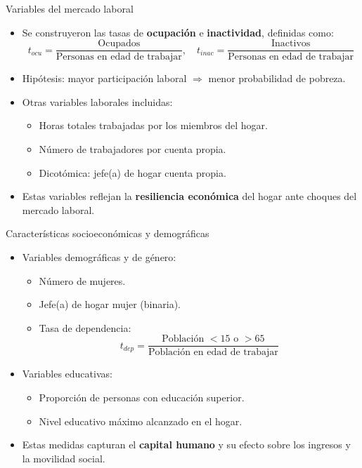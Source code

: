 \documentclass[10pt]{beamer}
\begin{document}
\begin{frame}{Variables del mercado laboral}
\small
\begin{itemize}
    \item Se construyeron las tasas de \textbf{ocupación} e \textbf{inactividad}, definidas como:
    \[
    t_{ocu} = \frac{\text{Ocupados}}{\text{Personas en edad de trabajar}}, \quad
    t_{inac} = \frac{\text{Inactivos}}{\text{Personas en edad de trabajar}}
    \]
    \item Hipótesis: mayor participación laboral $\Rightarrow$ menor probabilidad de pobreza.
    \item Otras variables laborales incluidas:
    \begin{itemize}
        \item Horas totales trabajadas por los miembros del hogar.
        \item Número de trabajadores por cuenta propia.
        \item Dicotómica: jefe(a) de hogar cuenta propia.
    \end{itemize}
    \item Estas variables reflejan la \textbf{resiliencia económica} del hogar ante choques del mercado laboral.
\end{itemize}
\end{frame}

\begin{frame}{Características socioeconómicas y demográficas}
\small
\begin{itemize}
    \item Variables demográficas y de género:
    \begin{itemize}
        \item Número de mujeres.
        \item Jefe(a) de hogar mujer (binaria).
        \item Tasa de dependencia:
        \[
        t_{dep} = \frac{\text{Población $<$15 o $>$65}}{\text{Población en edad de trabajar}}
        \]
    \end{itemize}
    \item Variables educativas:
    \begin{itemize}
        \item Proporción de personas con educación superior.
        \item Nivel educativo máximo alcanzado en el hogar.
    \end{itemize}
    \item Estas medidas capturan el \textbf{capital humano} y su efecto sobre los ingresos y la movilidad social.
\end{itemize}
\end{frame}
\end{document}
